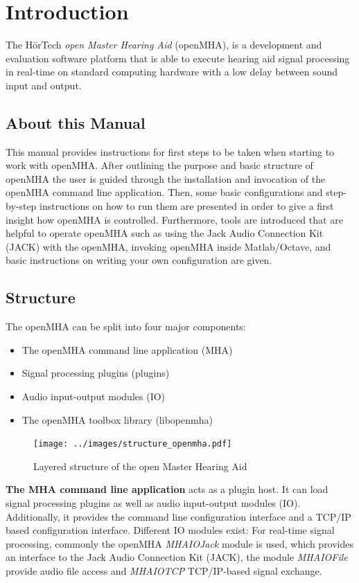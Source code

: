 \documentclass[11pt,a4paper,twoside]{article}
\newcommand{\+}{\discretionary{\mbox{\scriptsize$\hookleftarrow$}}{}{}}
\begin{document}
\newpage
\MHAcopyright{}
\newpage
\tableofcontents
\newpage
{}


\section{Introduction}
The H\"{o}rTech \emph{open Master Hearing Aid} (openMHA), is a
development and evaluation software platform that is able to execute
hearing aid signal processing in real-time on standard computing
hardware with a low delay between sound input and output.

\subsection{About this Manual}
This manual provides instructions for first steps to be taken when
starting to work with openMHA. After outlining the purpose and basic
structure of openMHA the user is guided through the installation and
invocation of the openMHA command line application. Then, some basic
configurations and step-by-step instructions on how to run them are
presented in order to give a first insight how openMHA is
controlled. Furthermore, tools are introduced that are helpful to
operate openMHA such as using the Jack Audio Connection Kit (JACK)
with the openMHA, invoking openMHA inside Matlab/Octave, and basic
instructions on writing your own configuration are given.


\subsection{Structure}\label{index_str}
The openMHA can be split into four major components:
\begin{itemize}
\item The openMHA command line application (MHA)
\item Signal processing plugins (plugins)
\item Audio input-output modules (IO)
\item The openMHA toolbox library (libopenmha)
\end{itemize} 
\begin{figure}[H]
  \centering
  \texttt{[image: ../images/structure\_openmha.pdf]}
  \caption[openMHA structure]{Layered structure of the open Master
    Hearing Aid}
  \label{structure_openmha}
\end{figure}


{\bf The MHA command line application} acts as a plugin host. It can
load signal processing plugins as well as audio input-output modules
(IO). Additionally, it provides the command line configuration
interface and a TCP/IP based configuration interface. Different IO
modules exist: For real-time signal processing, commonly the openMHA
\emph{MHAIOJack} module is used, which
provides an interface to the Jack Audio Connection Kit (JACK), the
module \emph{MHAIOFile} provide audio file access and \emph{MHAIOTCP}
TCP/IP-based signal exchange.
\end{document}
